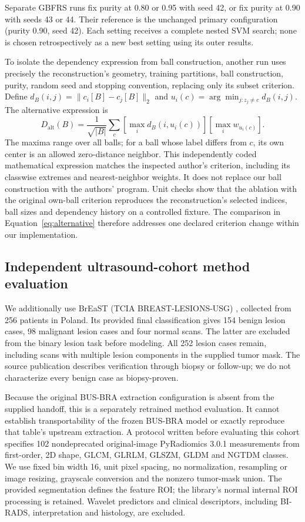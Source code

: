 \documentclass[11pt,a4paper]{article}
\begin{document}
Separate GBFRS runs fix purity at 0.80 or 0.95 with seed 42, or fix purity at 0.90 with seeds 43 or 44. Their reference is the unchanged primary configuration (purity 0.90, seed 42). Each setting receives a complete nested SVM search; none is chosen retrospectively as a new best setting using its outer results.

To isolate the dependency expression from ball construction, another run uses precisely the reconstruction's geometry, training partitions, ball construction, purity, random seed and stopping convention, replacing only its subset criterion. Define $d_B(i,j)=\|c_i[B]-c_j[B]\|_2$ and $u_i(c)=\arg\min_{j:z_j\ne c}d_B(i,j)$. The alternative expression is
\begin{equation}\label{eq:alternative}
 D_{\mathrm{alt}}(B)=\frac{1}{\sqrt{|B|}}\sum_c
 \left[\max_i d_B(i,u_i(c))\right]
 \left[\max_i w_{u_i(c)}\right].
\end{equation}
The maxima range over all balls; for a ball whose label differs from $c$, its own center is an allowed zero-distance neighbor. This independently coded mathematical expression matches the inspected author's criterion, including its classwise extremes and nearest-neighbor weights. It does not replace our ball construction with the authors' program. Unit checks show that the ablation with the original own-ball criterion reproduces the reconstruction's selected indices, ball sizes and dependency history on a controlled fixture. The comparison in Equation~\ref{eq:alternative} therefore addresses one declared criterion change within our implementation.

\subsection{Independent ultrasound-cohort method evaluation}\label{sec:breast}
We additionally use BrEaST (TCIA BREAST-LESIONS-USG) \cite{breast}, collected from 256 patients in Poland. Its provided final classification gives 154 benign lesion cases, 98 malignant lesion cases and four normal scans. The latter are excluded from the binary lesion task before modeling. All 252 lesion cases remain, including scans with multiple lesion components in the supplied tumor mask. The source publication describes verification through biopsy or follow-up; we do not characterize every benign case as biopsy-proven.

Because the original BUS-BRA extraction configuration is absent from the supplied handoff, this is a separately retrained method evaluation. It cannot establish transportability of the frozen BUS-BRA model or exactly reproduce that table's upstream extraction. A protocol written before evaluating this cohort specifies 102 nondeprecated original-image PyRadiomics 3.0.1 measurements from first-order, 2D shape, GLCM, GLRLM, GLSZM, GLDM and NGTDM classes. We use fixed bin width 16, unit pixel spacing, no normalization, resampling or image resizing, grayscale conversion and the nonzero tumor-mask union. The provided segmentation defines the feature ROI; the library's normal internal ROI processing is retained. Wavelet predictors and clinical descriptors, including BI-RADS, interpretation and histology, are excluded.
\end{document}
